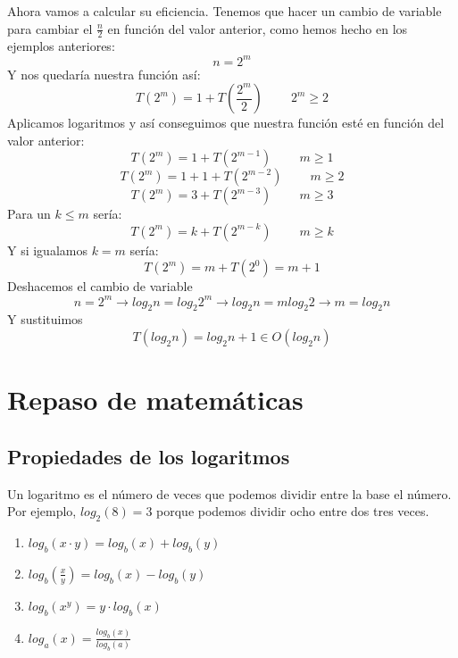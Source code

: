 \documentclass[10pt,a4paper,spanish]{report}
\begin{document}
\noindent
Ahora vamos a calcular su eficiencia. Tenemos que hacer un cambio de variable para cambiar el $\frac{n}{2}$ en función del valor anterior, como hemos hecho en los ejemplos anteriores:
\begin{displaymath}
n = 2^{m}
\end{displaymath}
\noindent
Y nos quedaría nuestra función así:
\begin{displaymath}
T(2^{m}) = 1 + T(\frac{2^{m}}{2}) \qquad\ 2^{m} \geq 2
\end{displaymath}
\noindent
Aplicamos logaritmos y así conseguimos que nuestra función esté en función del valor anterior:
\begin{displaymath}
T(2^{m}) = 1 + T(2^{m-1}) \qquad\ m \geq 1
\end{displaymath}
\begin{displaymath}
T(2^{m}) = 1 + 1 + T(2^{m-2}) \qquad\ m \geq 2
\end{displaymath}
\begin{displaymath}
T(2^{m}) = 3 + T(2^{m-3}) \qquad\ m \geq 3
\end{displaymath}
\noindent
Para un $k \leq m$ sería:
\begin{displaymath}
T(2^{m}) = k + T(2^{m-k}) \qquad\ m \geq k
\end{displaymath}
\noindent
Y si igualamos $k=m$ sería:
\begin{displaymath}
T(2^{m}) = m + T(2^{0}) = m + 1
\end{displaymath}
\noindent
Deshacemos el cambio de variable
\begin{displaymath}
n = 2^{m} \longrightarrow log_{2} n = log_{2} 2^{m} \longrightarrow log_{2} n = m log_{2} 2 \longrightarrow m = log_{2} n
\end{displaymath}
\noindent
Y sustituimos
\begin{displaymath}
T(log_{2} n) = log_{2} n+1 \in O(log_{2} n)
\end{displaymath}

\section{\textcolor[rgb]{0.1,0.2,0.6}Repaso de matemáticas}
\subsection{\textcolor[rgb]{0.1,0.2,0.6}Propiedades de los logaritmos}
\noindent
Un logaritmo es el número de veces que podemos dividir entre la base el número. Por ejemplo, $log_{2} (8) = 3$ porque podemos dividir ocho entre dos tres veces.
\begin{enumerate}[$\rightarrow$]
\item $log_{b}(x \cdot y) = log_{b} (x) + log_{b} (y)$
\item $log_{b} (\frac{x}{y}) = log_{b}(x) - log_{b}(y)$
\item $log_{b} (x^{y}) = y \cdot log_{b}(x)$
\item $log_{a} (x) = \frac{log_{b}(x)}{log_{b}(a)}$
\end{enumerate}
\end{document}
